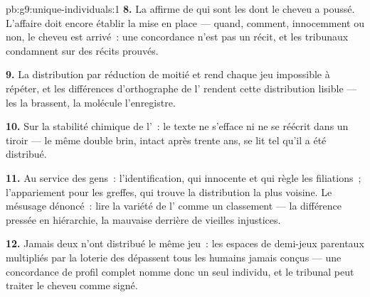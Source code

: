 \begin{solution}{pb:g9:unique-individuals:1}
\textbf{8.} La  affirme de qui sont les 
dont le cheveu a poussé. L'affaire doit encore établir la
mise en place --- quand, comment, innocemment ou non, le
cheveu est arrivé~: une concordance n'est pas un récit, et
les tribunaux condamnent sur des récits prouvés.

\textbf{9.} La distribution par réduction de moitié et
 rend chaque jeu impossible à répéter, et les
différences d'orthographe de l' rendent cette
distribution lisible --- les  la brassent, la
molécule l'enregistre.

\textbf{10.} Sur la stabilité chimique de l'~: le texte
ne s'efface ni ne se réécrit dans un tiroir --- le même
double brin, intact après trente ans, se lit tel qu'il a été
distribué.

\textbf{11.} Au service des gens~: l'identification, qui
innocente et qui règle les filiations~; l'appariement pour
les greffes, qui trouve la distribution la plus voisine. Le
mésusage dénoncé~: lire la variété de l' comme un
classement --- la différence pressée en hiérarchie, la
mauvaise  derrière de vieilles injustices.

\textbf{12.} Jamais deux  n'ont distribué le
même jeu~: les espaces de demi-jeux parentaux multipliés par
la loterie des  dépassent tous les humains jamais
conçus --- une concordance de profil complet nomme donc un
seul individu, et le tribunal peut traiter le cheveu comme
signé.
\end{solution}
